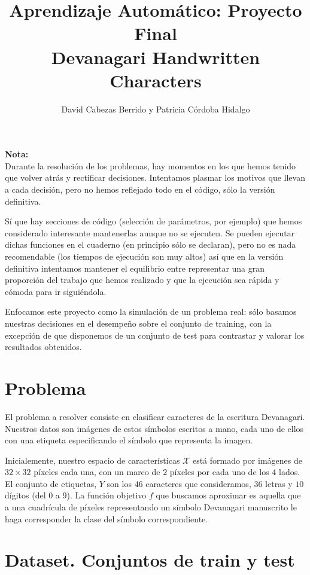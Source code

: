 \documentclass[a4]{article}
\title{\vspace{-15mm}Aprendizaje Automático: Proyecto Final \\ Devanagari Handwritten Characters}
\author{David Cabezas Berrido y Patricia Córdoba Hidalgo}
\date{}
\begin{document}
\maketitle
\tableofcontents

\vfill

\textbf{Nota:} \\ Durante la resolución de los problemas, hay momentos
en los que hemos tenido que volver atrás y rectificar
decisiones. Intentamos plasmar los motivos que llevan a cada decisión,
pero no hemos reflejado todo en el código, sólo la versión definitiva.

Sí que hay secciones de código (selección de parámetros, por ejemplo)
que hemos considerado interesante mantenerlas aunque no se
ejecuten. Se pueden ejecutar dichas funciones en el cuaderno (en
principio sólo se declaran), pero no es nada recomendable (los tiempos
de ejecución son muy altos) así que en la versión definitiva
intentamos mantener el equilibrio entre representar una gran
proporción del trabajo que hemos realizado y que la ejecución sea
rápida y cómoda para ir siguiéndola.

Enfocamos este proyecto como la simulación de un problema real: sólo
basamos nuestras decisiones en el desempeño sobre el conjunto de
training, con la excepción de que disponemos de un conjunto de test
para contrastar y valorar los resultados obtenidos.

\newpage

\section{Problema}

El problema a resolver consiste en clasificar caracteres de la
escritura Devanagari. Nuestros datos son imágenes de estos símbolos
escritos a mano, cada uno de ellos con una etiqueta especificando el
símbolo que representa la imagen.

Inicialemente, nuestro espacio de características $\mathcal{X}$ está
formado por imágenes de $32 \times 32$ píxeles cada una, con un marco
de $2$ píxeles por cada uno de los $4$ lados. El conjunto de
etiquetas, $Y$ son los $46$ caracteres que consideramos, $36$ letras y
$10$ dígitos (del $0$ a $9$). La función objetivo $f$ que buscamos
aproximar es aquella que a una cuadrícula de píxeles representando un
símbolo Devanagari manuscrito le haga corresponder la clase del
símbolo correspondiente.

\section{Dataset. Conjuntos de train y test}
\end{document}
